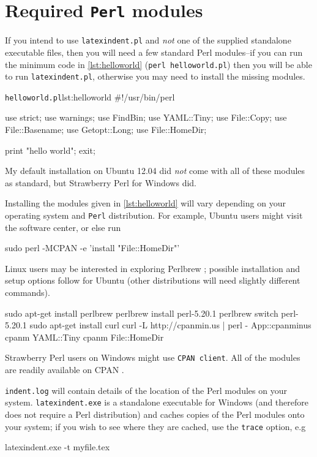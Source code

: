 \appendix
	\section{Required \texttt{Perl} modules}\label{sec:requiredmodules}
	 If you intend to use \texttt{latexindent.pl} and \emph{not} one of the supplied standalone executable files, then you will need a few standard Perl modules--if you can run the
	 minimum code in \cref{lst:helloworld} (\texttt{perl helloworld.pl}) then you will be able to run \texttt{latexindent.pl}, otherwise you may
	 need to install the missing modules.

	 \begin{cmhlistings}[language=Perl]{\texttt{helloworld.pl}}{lst:helloworld}
	#!/usr/bin/perl

	use strict;
	use warnings;
	use FindBin;
	use YAML::Tiny;
	use File::Copy;
	use File::Basename;
	use Getopt::Long;
	use File::HomeDir;

	print "hello world";
	exit;
\end{cmhlistings}
	 My default installation on Ubuntu 12.04 did \emph{not} come
	 with all of these modules as standard, but Strawberry Perl for Windows \cite{strawberryperl}
	 did.

	 Installing the modules given in \cref{lst:helloworld} will vary depending on your
	 operating system and \texttt{Perl} distribution. For example, Ubuntu users
	 might visit the software center, or else run
	 \begin{commandshell}
sudo perl -MCPAN -e 'install "File::HomeDir"'
 \end{commandshell}

	 Linux users may be interested in exploring Perlbrew \cite{perlbrew}; possible installation and setup
	 options follow for Ubuntu (other distributions will need slightly different commands).
	 \begin{commandshell}
sudo apt-get install perlbrew
perlbrew install perl-5.20.1
perlbrew switch perl-5.20.1
sudo apt-get install curl
curl -L http://cpanmin.us | perl - App::cpanminus
cpanm YAML::Tiny
cpanm File::HomeDir
\end{commandshell}

	 Strawberry Perl users on Windows might use
	 \texttt{CPAN client}. All of the modules are readily available on CPAN \cite{cpan}.

	 \texttt{indent.log} will contain details of the location
	 of the Perl modules on your system.  \texttt{latexindent.exe} is a standalone
	 executable for Windows (and therefore does not require a Perl distribution) and caches copies of the Perl modules onto your system; if you
	 wish to see where they are cached, use the  \texttt{trace} option, e.g
	 \begin{dosprompt}
latexindent.exe -t myfile.tex
 \end{dosprompt}

